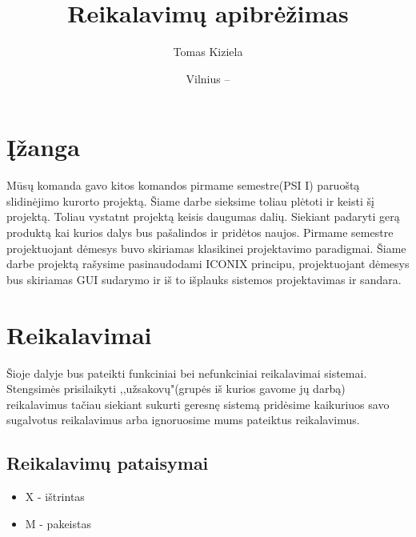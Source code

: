 \documentclass[oneside]{VUMIFPSkursinis}
\title{Reikalavimų apibrėžimas}
\author{Tomas Kiziela}
\date{Vilnius – \the\year}
\begin{document}
\maketitle
\tableofcontents

\section{Įžanga}
Mūsų komanda gavo kitos komandos pirmame semestre(PSI I) paruoštą slidinėjimo kurorto projektą. Šiame darbe sieksime toliau plėtoti ir keisti šį projektą. Toliau vystatnt projektą keisis daugumas dalių. Siekiant padaryti gerą produktą kai kurios  dalys bus pašalindos ir pridėtos naujos. Pirmame semestre projektuojant dėmesys buvo skiriamas klasikinei projektavimo paradigmai. Šiame darbe projektą rašysime pasinaudodami ICONIX principu, projektuojant dėmesys bus skiriamas GUI sudarymo ir iš to išplauks sistemos projektavimas ir sandara. 

\section{Reikalavimai}
Šioje dalyje bus pateikti funkciniai bei nefunkciniai reikalavimai sistemai. Stengsimės prisilaikyti ,,užsakovų"(grupės iš kurios gavome jų darbą) reikalavimus tačiau siekiant sukurti geresnę sistemą pridėsime kaikuriuos savo sugalvotus reikalavimus arba ignoruosime mums pateiktus reikalavimus. 

\subsection{Reikalavimų pataisymai}
	\begin{itemize}
		\item{X - ištrintas}
		\item{M - pakeistas}
	\end{itemize}


\end{document}
